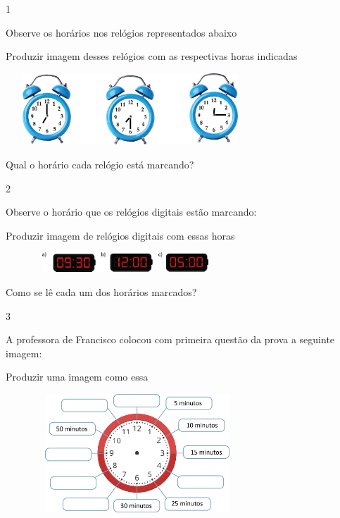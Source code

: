 
\num{1}

Observe os horários nos relógios representados abaixo

Produzir imagem desses relógios com as respectivas horas indicadas

\includegraphics[width=3.66698in,height=1.05843in]{media/image51.png}

Qual o horário cada relógio está marcando?


\num{2}

Observe o horário que os relógios digitais estão marcando:

Produzir imagem de relógios digitais com essas horas

\includegraphics[width=3.54197in,height=0.29169in]{media/image52.png}

Como se lê cada um dos horários marcados?


\num{3}

A professora de Francisco colocou com primeira questão da prova a
seguinte imagem:

Produzir uma imagem como essa

\includegraphics[width=3.90034in,height=1.75015in]{media/image53.png}

